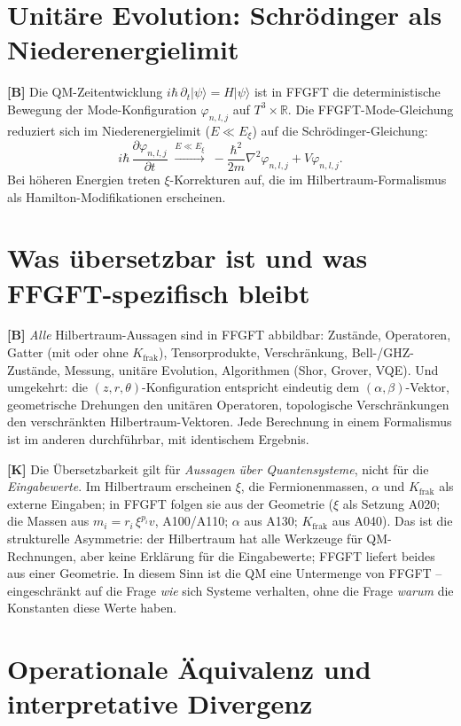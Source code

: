 \section{Unitäre Evolution: Schrödinger als Niederenergielimit}

\textbf{[B]} Die QM-Zeitentwicklung $i\hbar\,\partial_t|\psi\rangle = H|\psi\rangle$
ist in FFGFT die deterministische Bewegung der Mode-Konfiguration
$\varphi_{n,l,j}$ auf $T^3\times\mathbb{R}$. Die FFGFT-Mode-Gleichung reduziert
sich im Niederenergielimit ($E\ll E_\xi$) auf die Schrödinger-Gleichung:
\[
  i\hbar\,\frac{\partial\varphi_{n,l,j}}{\partial t}
  \;\xrightarrow{E\ll E_\xi}\;
  -\frac{\hbar^2}{2m}\nabla^2\varphi_{n,l,j} + V\varphi_{n,l,j}.
\]
Bei höheren Energien treten $\xi$-Korrekturen auf, die im
Hilbertraum-Formalismus als Hamilton-Modifikationen erscheinen.

\section{Was übersetzbar ist und was FFGFT-spezifisch bleibt}

\textbf{[B]} \emph{Alle} Hilbertraum-Aussagen sind in FFGFT abbildbar: Zustände,
Operatoren, Gatter (mit oder ohne $K_{\text{frak}}$), Tensorprodukte,
Verschränkung, Bell-/GHZ-Zustände, Messung, unitäre Evolution, Algorithmen
(Shor, Grover, VQE). Und umgekehrt: die $(z,r,\theta)$-Konfiguration entspricht
eindeutig dem $(\alpha,\beta)$-Vektor, geometrische Drehungen den unitären
Operatoren, topologische Verschränkungen den verschränkten Hilbertraum-Vektoren.
Jede Berechnung in einem Formalismus ist im anderen durchführbar, mit identischem
Ergebnis.

\textbf{[K]} Die Übersetzbarkeit gilt für \emph{Aussagen über Quantensysteme},
nicht für die \emph{Eingabewerte}. Im Hilbertraum erscheinen $\xi$, die
Fermionenmassen, $\alpha$ und $K_{\text{frak}}$ als externe Eingaben; in FFGFT
folgen sie aus der Geometrie ($\xi$ als Setzung A020; die Massen aus
$m_i = r_i\,\xi^{p_i}v$, A100/A110; $\alpha$ aus A130; $K_{\text{frak}}$ aus
A040). Das ist die strukturelle Asymmetrie: der Hilbertraum hat alle Werkzeuge
für QM-Rechnungen, aber keine Erklärung für die Eingabewerte; FFGFT liefert
beides aus einer Geometrie. In diesem Sinn ist die QM eine Untermenge von FFGFT
-- eingeschränkt auf die Frage \emph{wie} sich Systeme verhalten, ohne die Frage
\emph{warum} die Konstanten diese Werte haben.

\section{Operationale Äquivalenz und interpretative Divergenz}

